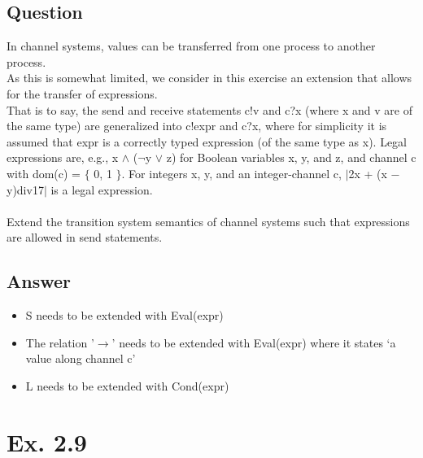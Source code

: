\documentclass[12pt]{article}
\begin{document}
\subsection*{Question}
In channel systems, values can be transferred from one process to another process.\\
As this is somewhat limited, we consider in this exercise an extension that allows for the transfer
of expressions.\\
That is to say, the send and receive statements c!v and c?x (where x and v are of
the same type) are generalized into c!expr and c?x, where for simplicity it is assumed that expr
is a correctly typed expression (of the same type as x). Legal expressions are, e.g., x $\wedge$ ($\neg$y $\lor$ z)
for Boolean variables x, y, and z, and channel c with dom(c) = $\{$ 0, 1 $\}$. For integers x, y, and an
integer-channel c, $|$2x + (x − y)div17$|$ is a legal expression.\\
\\
Extend the transition system semantics of channel systems such that expressions are
allowed in send statements.
\subsection*{Answer}
\begin{itemize}
	\item S needs to be extended with Eval(expr)
	\item The relation '$\rightarrow$' needs to be extended with Eval(expr) where it states `a value along channel c'
	\item L needs to be extended with Cond(expr)
\end{itemize}

\newpage
\section*{Ex. 2.9}
\end{document}
